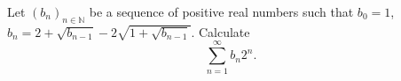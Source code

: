 Let \((b_{n})_{n\in \mathbb{N}}\) be a sequence of positive real numbers such that \(b_{0}=1\),
\(b_{n}=2+\sqrt{b_{n-1}}-2\sqrt{1+\sqrt{b_{n-1}}}\). Calculate
\[\sum_{n=1}^{\infty}b_{n}2^{n}.\]